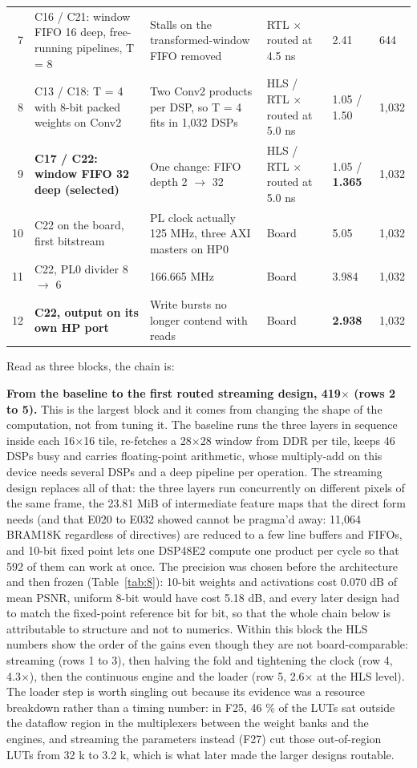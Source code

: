 \begin{table}[!htbp]
\begin{tabularx}{\linewidth}{rL{3.0cm}YL{2.3cm}R{1.3cm}L{1.7cm}}
7 & C16 / C21: window FIFO 16 deep, free-running pipelines, T = 8 & Stalls on the transformed-window FIFO removed & RTL $\times$ routed at 4.5 ns & 2.41 & 644 \\
8 & C13 / C18: T = 4 with 8-bit packed weights on Conv2 & Two Conv2 products per DSP, so T = 4 fits in 1,032 DSPs & HLS / RTL $\times$ routed at 5.0 ns & 1.05 / 1.50 & 1,032 \\
9 & \textbf{C17 / C22: window FIFO 32 deep (selected)} & One change: FIFO depth 2 $\rightarrow$ 32 & HLS / RTL $\times$ routed at 5.0 ns & 1.05 / \textbf{1.365} & 1,032 \\
10 & C22 on the board, first bitstream & PL clock actually 125 MHz, three AXI masters on HP0 & Board & 5.05 & 1,032 \\
11 & C22, PL0 divider 8 $\rightarrow$ 6 & 166.665 MHz & Board & 3.984 & 1,032 \\
12 & \textbf{C22, output on its own HP port} & Write bursts no longer contend with reads & Board & \textbf{2.938} & 1,032 \\
\bottomrule
\end{tabularx}
\end{table}

Read as three blocks, the chain is:

\textbf{From the baseline to the first routed streaming design, 419$\times$ (rows 2 to 5).} This is the largest block and it comes from changing the shape of the computation, not from tuning it. The baseline runs the three layers in sequence inside each 16$\times$16 tile, re-fetches a 28$\times$28 window from DDR per tile, keeps 46 DSPs busy and carries floating-point arithmetic, whose multiply-add on this device needs several DSPs and a deep pipeline per operation. The streaming design replaces all of that: the three layers run concurrently on different pixels of the same frame, the 23.81 MiB of intermediate feature maps that the direct form needs (and that E020 to E032 showed cannot be pragma'd away: 11,064 BRAM18K regardless of directives) are reduced to a few line buffers and FIFOs, and 10-bit fixed point lets one DSP48E2 compute one product per cycle so that 592 of them can work at once. The precision was chosen before the architecture and then frozen (Table~\ref{tab:8}): 10-bit weights and activations cost 0.070 dB of mean PSNR, uniform 8-bit would have cost 5.18 dB, and every later design had to match the fixed-point reference bit for bit, so that the whole chain below is attributable to structure and not to numerics. Within this block the HLS numbers show the order of the gains even though they are not board-comparable: streaming (rows 1 to 3), then halving the fold and tightening the clock (row 4, 4.3$\times$), then the continuous engine and the loader (row 5, 2.6$\times$ at the HLS level). The loader step is worth singling out because its evidence was a resource breakdown rather than a timing number: in F25, 46 \% of the LUTs sat outside the dataflow region in the multiplexers between the weight banks and the engines, and streaming the parameters instead (F27) cut those out-of-region LUTs from 32 k to 3.2 k, which is what later made the larger designs routable.

